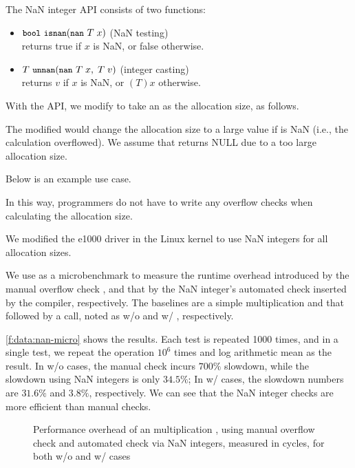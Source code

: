 \noindent
The NaN integer API consists of two functions:
\begin{itemize}
\item
$\cc{bool}\ \cc{isnan}(\cc{nan}\ T\; x)$ \hfill (NaN testing) \\
returns true if $x$ is NaN, or false otherwise.
\item
$T\ \cc{unnan}(\cc{nan}\ T\; x,\; T\; v)$ \hfill (integer casting) \\
returns $v$ if $x$ is NaN, or $(T)x$ otherwise.
\end{itemize}
With the API, we modify  to take an  as
the allocation size, as follows.

The modified  would change the allocation size to a large
value  if  is NaN (i.e., the calculation
overflowed).  We assume that  returns
NULL due to a too large allocation size.

Below is an example use case.

In this way, programmers do not have to write any overflow checks
when calculating the allocation size.

We modified the e1000 driver in the Linux kernel to use NaN integers
for all allocation sizes.

We use  as a microbenchmark to measure the runtime
overhead introduced by the manual overflow check , and that by the NaN integer's automated check
inserted by the compiler, respectively.
%
The baselines are a simple multiplication and that followed by a
 call, noted as w/o and w/ , respectively.

\autoref{f:data:nan-micro} shows the results. Each test is repeated 1000 times,
and in a single test, we repeat the operation $10^6$ times and log arithmetic mean
as the result.
%
In w/o  cases, the manual check incurs $700\%$ slowdown, while
the slowdown using NaN integers is only $34.5\%$;
%
In w/  cases, the slowdown numbers are $31.6\%$ and $3.8\%$,
respectively.
%
We can see that the NaN integer checks are more efficient than
manual checks.

\begin{figure}
\centering

\caption{Performance overhead of an multiplication , using
manual overflow check  and automated
check via NaN integers, measured in cycles, for both w/o and w/  cases}
\label{f:data:nan-micro}
\end{figure}

